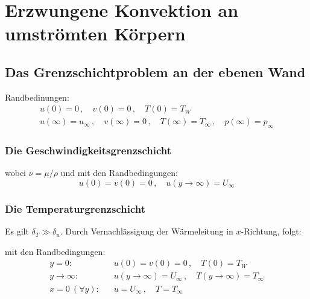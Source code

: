 
\section{Erzwungene Konvektion an um\-ström\-ten Kör\-pern} %
	\subsection{Das Grenzschichtproblem an der ebenen Wand} %
		Randbedinungen:
		\begin{gather*}
			u(0) = 0\,,\quad v(0) = 0\,,\quad T(0) = T_W \\
			u(\infty) = u_\infty\,,\quad v(\infty) = 0\,,\quad T(\infty) = T_\infty\,,\quad p(\infty) = p_\infty
		\end{gather*}

		\subsubsection{Die Geschwindigkeitsgrenzschicht} %
			wobei $\nu = \mu / \rho$ und mit den Randbedingungen:
			\[
				u(0) = v(0) = 0\,,\quad u(y \to \infty) = U_\infty
			\]

		\subsubsection{Die Temperaturgrenzschicht} %
			Es gilt $\delta_T \gg \delta_u$. Durch Vernachlässigung der Wärmeleitung in $x$-Richtung, folgt:

			mit den Randbedingungen:
			\begin{align*}
				y = 0\text{:} \quad & u(0) = v(0) = 0 \,,\quad T(0) = T_W \\
				y \to \infty\text{:} \quad & u(y \to \infty) = U_\infty \,,\quad T(y \to \infty) = T_\infty \\
				x = 0 \ (\forall y)\text{:} \quad & u = U_\infty \,,\quad T = T_\infty
			\end{align*}

